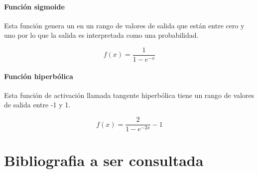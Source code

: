 \documentclass[
  12pt,
]{article}
\begin{document}
\hypertarget{funciuxf3n-sigmoide}{%
\paragraph{Función sigmoide}\label{funciuxf3n-sigmoide}}

Esta función genera un en un rango de valores de salida que están entre
cero y uno por lo que la salida es interpretada como una probabilidad.

\[ f(x) = \frac{1}{1-e^{-x}}\]

\hypertarget{funciuxf3n-hiperbuxf3lica}{%
\paragraph{Función hiperbólica}\label{funciuxf3n-hiperbuxf3lica}}

Esta función de activación llamada tangente hiperbólica tiene un rango
de valores de salida entre -1 y 1.

\[ f(x) = \frac{2}{1-e^{-2x}} - 1 \]

\newpage

\hypertarget{bibliografia-a-ser-consultada}{%
\section{Bibliografia a ser
consultada}\label{bibliografia-a-ser-consultada}}
\end{document}
